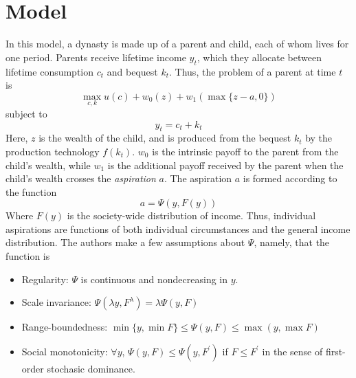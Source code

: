 \documentclass[11pt]{article}
\begin{document}
    \section{Model}
    In this model, a dynasty is made up of a parent and child, each of whom lives for one period. Parents receive lifetime income \( y_t \), which they allocate between lifetime consumption \( c_t \) and bequest \( k_t \). Thus, the problem of a parent at time \( t \) is 
    \[\max_{c, k} u(c) + w_0(z) + w_1(\max\{z - a, 0\})\]
    subject to 
    \[y_t = c_t + k_t\]
    Here, \( z \) is the wealth of the child, and is produced from the bequest \( k_t \) by the production technology \( f(k_t) \). \( w_0 \) is the intrinsic payoff to the parent from the child's wealth, while \( w_1 \) is the additional payoff received by the parent when the child's wealth crosses the \textit{aspiration} \( a \). The aspiration \( a \) is formed according to the function
    \[a = \Psi(y, F(y))\]
    Where \( F(y) \) is the society-wide distribution of income. Thus, individual aspirations are functions of both individual circumstances and the general income distribution. The authors make a few assumptions about \( \Psi \), namely, that the function is 
    \begin{itemize}
        \item Regularity: \( \Psi \) is continuous and nondecreasing in \( y \). 
        \item Scale invariance: \(\Psi(\lambda y, F^\lambda) = \lambda\Psi(y, F) \)
        \item  Range-boundedness: $\min\{y, \min F\} \leq \Psi(y, F) \leq \max(y, \max F)$ 
        \item  Social monotonicity: $\forall y$, $\Psi(y,F) \leq \Psi(y, F^\prime)$ if $F \leq F^\prime$ in the sense of first-order stochasic dominance. 
    \end{itemize}
\end{document}
